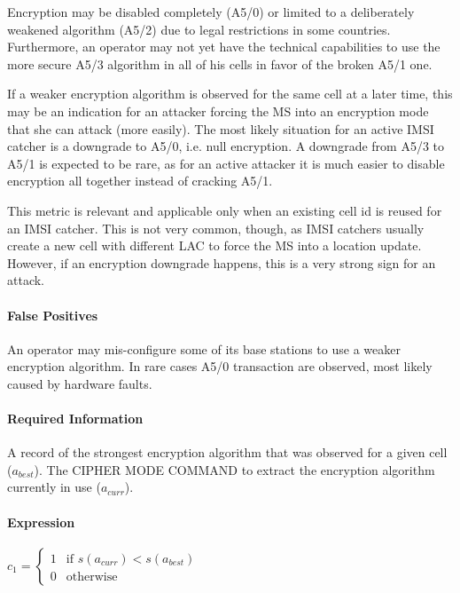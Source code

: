 \documentclass[a4paper,11pt,notitlepage,bigheadings,oneside]{scrartcl}
\begin{document}
Encryption may be disabled completely (A5/0) or limited to a deliberately
weakened algorithm (A5/2) due to legal restrictions in some countries.
Furthermore, an operator may not yet have the technical capabilities to use the
more secure A5/3 algorithm in all of his cells in favor of the broken A5/1 one.

If a weaker encryption algorithm is observed for the same cell at a later time,
this may be an indication for an attacker forcing the MS into an encryption
mode that she can attack (more easily). The most likely situation for an active
IMSI catcher is a downgrade to A5/0, i.e. null encryption. A downgrade from
A5/3 to A5/1 is expected to be rare, as for an active attacker it is much
easier to disable encryption all together instead of cracking A5/1.

This metric is relevant and applicable only when an existing cell id is reused
for an IMSI catcher. This is not very common, though, as IMSI catchers usually
create a new cell with different LAC to force the MS into a location update.
However, if an encryption downgrade happens, this is a very strong sign for an
attack.

\paragraph{False Positives}

An operator may mis-configure some of its base stations to use a weaker
encryption algorithm. In rare cases A5/0 transaction are observed, most likely
caused by hardware faults.


\paragraph{Required Information}

A record of the strongest encryption algorithm that was observed for a given
cell ($a_{best}$). The CIPHER MODE COMMAND to extract the encryption algorithm
currently in use ($a_{curr}$).

\paragraph{Expression}

$c_1 =
\begin{cases}
	1 & \text{if } s(a_{curr}) < s(a_{best}) \\
	0 & \text{otherwise}
\end{cases}$
\end{document}

